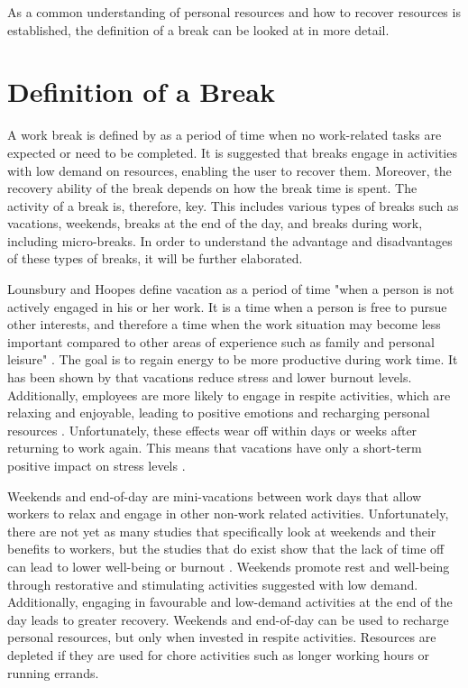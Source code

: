 \documentclass{hasel_thesis}
\begin{document}
As a common understanding of personal resources and how to recover resources is established, the definition of a break can be looked at in more detail.
 


\section{Definition of a Break}

A work break is defined by \cite{Trougakos.2009} as a period of time when no work-related tasks are expected or need to be completed. It is suggested that breaks engage in activities with low demand on resources, enabling the user to recover them. Moreover, the recovery ability of the break depends on how the break time is spent. The activity of a break is, therefore, key. This includes various types of breaks such as vacations, weekends, breaks at the end of the day, and breaks during work, including micro-breaks. In order to understand the advantage and disadvantages of these types of breaks, it will be further elaborated.


Lounsbury and Hoopes \cite{Lounsbury.1986} define vacation as a period of time "when a person is not actively engaged in his or her work. It is a time when a person is free to pursue other interests, and therefore a time when the work situation may become less important compared to other areas of experience such as family and personal leisure" \cite[p. 393]{Lounsbury.1986}. The goal is to regain energy to be more productive during work time. It has been shown by \cite{Westman.1997, Westman.2001} that vacations reduce stress and lower burnout levels. Additionally, employees are more likely to engage in respite activities, which are relaxing and enjoyable, leading to positive emotions and recharging personal resources \cite{Fritz.2006}. Unfortunately, these effects wear off within days or weeks after returning to work again. This means that vacations have only a short-term positive impact on stress levels \cite{Fritz.2006}.


Weekends and end-of-day are mini-vacations between work days that allow workers to relax and engage in other non-work related activities. Unfortunately, there are not yet as many studies that specifically look at weekends and their benefits to workers, but the studies that do exist show that the lack of time off can lead to lower well-being or burnout \cite{Fritz.2005}. Weekends promote rest and well-being through restorative and stimulating activities suggested with low demand. Additionally, engaging in favourable and low-demand activities at the end of the day leads to greater recovery. Weekends and end-of-day can be used to recharge personal resources, but only when invested in respite activities. Resources are depleted if they are used for chore activities such as longer working hours or running errands.
\end{document}
